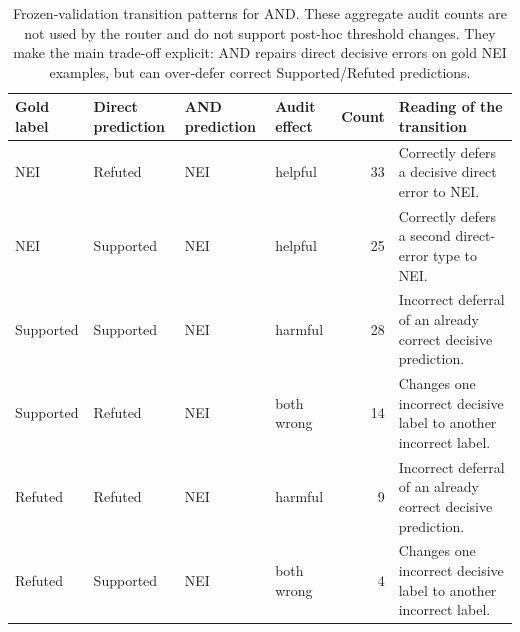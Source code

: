 \documentclass[11pt]{article}
\begin{document}
\begin{table}[t]
\centering\small
\begin{tabular}{@{}llllrp{5.05cm}@{}}
\toprule
Gold label & Direct prediction & AND prediction & Audit effect & Count & Reading of the transition\\
\midrule
\textsc{NEI} & Refuted & \textsc{NEI} & helpful & 33 & Correctly defers a decisive direct error to \textsc{NEI}.\\
\textsc{NEI} & Supported & \textsc{NEI} & helpful & 25 & Correctly defers a second direct-error type to \textsc{NEI}.\\
Supported & Supported & \textsc{NEI} & harmful & 28 & Incorrect deferral of an already correct decisive prediction.\\
Supported & Refuted & \textsc{NEI} & both wrong & 14 & Changes one incorrect decisive label to another incorrect label.\\
Refuted & Refuted & \textsc{NEI} & harmful & 9 & Incorrect deferral of an already correct decisive prediction.\\
Refuted & Supported & \textsc{NEI} & both wrong & 4 & Changes one incorrect decisive label to another incorrect label.\\
\bottomrule
\end{tabular}
\caption{Frozen-validation transition patterns for AND. These aggregate audit counts are not used by the router and do not support post-hoc threshold changes. They make the main trade-off explicit: AND repairs direct decisive errors on gold \textsc{NEI} examples, but can over-defer correct Supported/Refuted predictions.}\label{tab:qualitative-patterns}
\end{table}
\end{document}
